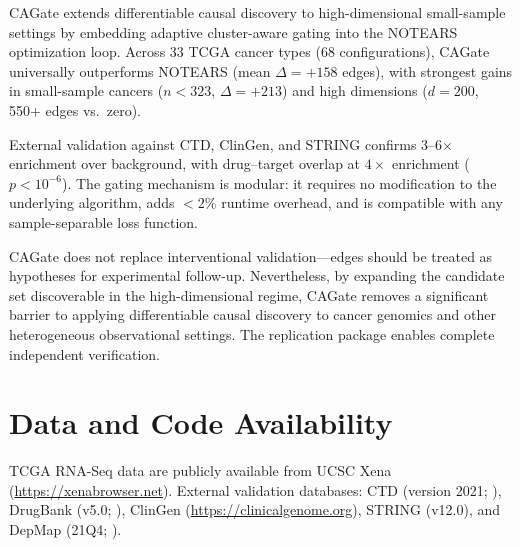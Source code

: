 \documentclass[12pt,a4paper]{article}
\begin{document}
CAGate extends differentiable causal discovery to high-dimensional small-sample settings by embedding adaptive cluster-aware gating into the NOTEARS optimization loop. Across 33 TCGA cancer types (68 configurations), CAGate universally outperforms NOTEARS (mean $\Delta = +158$ edges), with strongest gains in small-sample cancers ($n < 323$, $\Delta = +213$) and high dimensions ($d=200$, 550+ edges vs.\ zero).









External validation against CTD, ClinGen, and STRING confirms 3--6$\times$ enrichment over background, with drug--target overlap at $4\times$ enrichment ($p < 10^{-6}$). The gating mechanism is modular: it requires no modification to the underlying algorithm, adds $<2\%$ runtime overhead, and is compatible with any sample-separable loss function.









CAGate does not replace interventional validation---edges should be treated as hypotheses for experimental follow-up. Nevertheless, by expanding the candidate set discoverable in the high-dimensional regime, CAGate removes a significant barrier to applying differentiable causal discovery to cancer genomics and other heterogeneous observational settings. The replication package enables complete independent verification.













\section{Data and Code Availability}









TCGA RNA-Seq data are publicly available from UCSC Xena (\url{https://xenabrowser.net}). External validation databases: CTD (version 2021; \cite{Davis2021}), DrugBank (v5.0; \cite{Wishart2018}), ClinGen (\url{https://clinicalgenome.org}), STRING (v12.0), and DepMap (21Q4; \cite{Tsherniak2017}).
\end{document}
